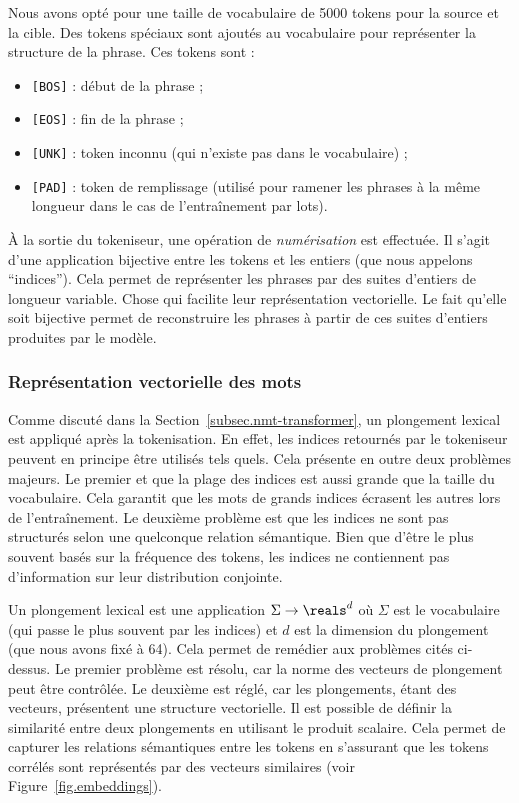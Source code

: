 Nous avons opté pour une taille de vocabulaire de 5000 tokens pour la source et la cible.
Des tokens spéciaux sont ajoutés au vocabulaire pour représenter la structure de la phrase.
Ces tokens sont :
\begin{itemize}
    \item \texttt{[BOS]} : début de la phrase ;
    \item \texttt{[EOS]} : fin de la phrase ;
    \item \texttt{[UNK]} : token inconnu (qui n'existe pas dans le vocabulaire) ;
    \item \texttt{[PAD]} : token de remplissage (utilisé pour ramener les phrases à la même longueur 
    dans le cas de l'entraînement par lots).
\end{itemize}

À la sortie du tokeniseur, une opération de \emph{numérisation} est effectuée.
Il s'agit d'une application bijective entre les tokens et les entiers (que nous appelons ``indices'').
Cela permet de représenter les phrases par des suites d'entiers de longueur variable.
Chose qui facilite leur représentation vectorielle.
Le fait qu'elle soit bijective permet de reconstruire les phrases 
à partir de ces suites d'entiers produites par le modèle.

\subsubsection{Représentation vectorielle des mots}

Comme discuté dans la Section~\ref{subsec.nmt-transformer},
un plongement lexical est appliqué après la tokenisation.
En effet, les indices retournés par le tokeniseur peuvent en principe être utilisés tels quels.
Cela présente en outre deux problèmes majeurs.
Le premier et que la plage des indices est aussi grande que la taille du vocabulaire.
Cela garantit que les mots de grands indices écrasent les autres lors de l'entraînement.
Le deuxième problème est que les indices ne sont pas structurés selon une quelconque relation sémantique.
Bien que d'être le plus souvent basés sur la fréquence des tokens, 
les indices ne contiennent pas d'information sur leur distribution conjointe.

Un plongement lexical est une application \(\Sigma \to \reals^d\) où \(\Sigma\) est le vocabulaire 
(qui passe le plus souvent par les indices) et \(d\) est la dimension du plongement (que nous avons fixé à 64).
Cela permet de remédier aux problèmes cités ci-dessus.
Le premier problème est résolu, car la norme des vecteurs de plongement peut être contrôlée.
Le deuxième est réglé, car les plongements, étant des vecteurs, présentent une structure vectorielle.
Il est possible de définir la similarité entre deux plongements en utilisant le produit scalaire.
Cela permet de capturer les relations sémantiques entre les tokens en s'assurant que les tokens corrélés
sont représentés par des vecteurs similaires (voir Figure~\ref{fig.embeddings}).

